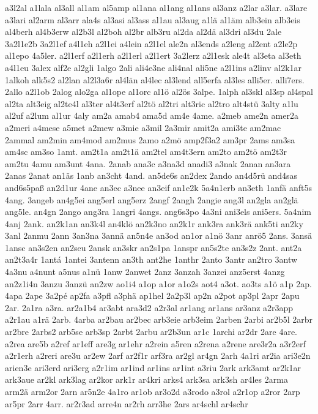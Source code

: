 {a3l2al
a1lala
al3all
al1am
al5amp
al1ana
al1ang
al1ans
al3anz
a2lar
a3lar.
a3lare
a3lari
al2arm
al3arr
ala4s
al3asi
al3ass
al1au
al3aug
a1lä
al1äm
alb3ein
alb3eis
al4berh
al4b3erw
al2b3l
al2boh
al2br
alb3ru
al2da
al2dä
al3dri
al3du
2ale
3a2l1e2b
3a2l1ef
a4l1eh
a2l1ei
a4lein
a2l1el
ale2n
al3ends
a2leng
al2ent
a2le2p
al1epo
4a5ler.
a2l1erf
a2l1erh
a2l1erl
a2l1ert
3a2lerz
a2l1esk
ale4t
al3eta
al3eth
a4l1eu
3alex
alf2e
al2gli
1algo
2ali
ali4e3ne
ali4nal
ali5ne
a2l1ins
a2linv
al2k1ar
1alkoh
alk5s2
al2lan
al2l3a6r
al4län
al4lec
al3lend
all5erfa
al3les
alli5er.
alli7ers.
2allo
a2l1ob
2alog
alo2ga
al1ope
al1orc
al1ö
al2ös
3alpe.
1alph
al3skl
al3sp
al4spal
al2ta
alt3eig
al2te4l
al3ter
al4t3erf
al2tö
al2tri
alt3ric
al2tro
alt4stü
3alty
a1lu
al2uf
a2lum
al1ur
4aly
am2a
amab4
ama5d
am4e
4ame.
a2meb
ame2n
amer2a
a2meri
a4mese
a5met
a2mew
a3mie
a3mil
2a3mir
amit2a
ami3te
am2mac
2ammal
am2min
am4mod
am2mus
2amo
a2mö
amp2f3a2
am3pr
2ams
am3sa
am4sc
am3so
1amt.
am2t1a
am2t1ä
am2tel
am4t3ern
am2to
am2tö
am2t3r
am2tu
4amu
am3unt
4ana.
2anab
ana3c
a3na3d
anadi3
a3nak
2anan
an3ara
2anas
2anat
an1äs
1anb
an3cht
4and.
an5de6s
an2dex
2ando
an4d5rü
and4sas
and6s5paß
an2d1ur
4ane
an3ec
a3nee
an3eif
an1e2k
5a4n1erb
an3eth
1anfä
anft5s
4ang.
3angeb
an4g5ei
ang5erl
ang5erz
2angf
2angh
2angie
ang3l
an2gla
an2glä
ang5le.
an4gn
2ango
ang3ra
1angri
4angs.
ang6s3po
4a3ni
ani3els
ani5ers.
5a4nim
4anj
2ank.
an2k1an
an3k4l
an4klö
an2k3no
an2k1r
ank3ra
ank3rä
ank5ti
an2ky
3anl
2anmu
2ann
3an3na
3annä
an5n4e
an3od
an1or
a1nö
3anr
anrö5
2ans.
3ansä
1ansc
an3s2en
an2seu
2ansk
an3skr
an2s1pa
1anspr
an5s2te
an3s2z
2ant.
ant2a
an2t3a4r
1antá
1antei
3antenn
an3th
ant2he
1anthr
2anto
3antr
an2tro
3antw
4a3nu
a4nunt
a5nus
a1nü
1anw
2anwet
2anz
3anzah
3anzei
anz5erst
4anzg
an2z1i4n
3anzu
3anzü
an2zw
ao1i4
a1op
a1or
a1o2s
aot4
a3ot.
ao3ts
a1ö
a1p
2ap.
4apa
2ape
3a2pé
ap2fa
a3pfl
a3phä
ap1hel
2a2p3l
ap2n
a2pot
ap3pl
2apr
2apu
2ar.
2a1ra
a3ra.
ar2a1b4
ar3abt
ara3d2
a2r3al
ar1ang
ar1ans
ar3anz
a2r3app
a2r1au
a1rä
2arb.
4arba
ar2bau
ar2bec
arb3eie
arb3eim
2arben
2arbi
ar2b5l
2arbr
ar2bre
2arbs2
arb5se
arb3sp
2arbt
2arbu
ar2b3un
ar1c
1archi
ar2dr
2are
4are.
a2rea
are5b
a2ref
ar1eff
are3g
ar1ehr
a2rein
a5ren
a2rena
a2rene
are3r2a
a3r2erf
a2r1erh
a2reri
are3u
ar2ew
2arf
ar2f1r
arf3ra
ar2gl
ar4gn
2arh
4a1ri
ar2ia
ari3e2n
arien3e
ari3erd
ari3erg
a2r1im
ar1ind
ar1ins
ar1int
a3riu
2ark
ark3amt
ar2k1ar
ark3aue
ar2kl
ark3lag
ar2kor
ark1r
ar4kri
arks4
ark3sa
ark3sh
ar4les
2arma
arm2ä
arm2or
2arn
ar5n2e
4a1ro
ar1ob
ar3o2d
a3rodo
a3rol
a2r1op
a2ror
2arp
ar5pr
2arr
4arr.
ar2r3ad
arre4n
ar2rh
arr3he
2ars
ar4schl
ar4schr
}
